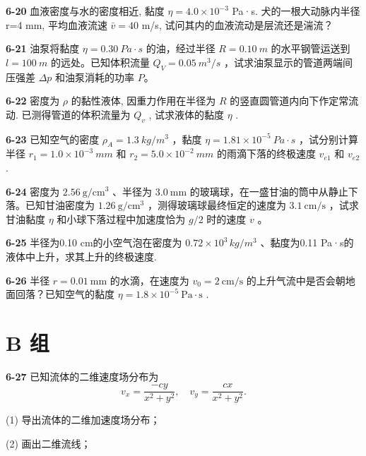 \newpage

\textbf{6-20} 血液密度与水的密度相近, 黏度 $\eta=4.0\times10^{-3}$ Pa·s. 犬的一根大动脉内半径 r=4 mm, 平均血液流速 $\bar{v}=40$ m/s, 试问其内的血液流动是层流还是湍流？

\newpage

\textbf{6-21} 油泵将黏度 $\eta=0.30\ Pa\cdot s$ 的油，经过半径 $R=0.10\ m$ 的水平钢管运送到 $l=100\ m$ 的远处。已知体积流量 $Q_{V}=0.05\ m^{3}/s$ ，试求油泵显示的管道两端间压强差 $\Delta p$ 和油泵消耗的功率 $P$。

\newpage

\textbf{6-22} 密度为 $\rho$ 的黏性液体, 因重力作用在半径为 $R$ 的竖直圆管道内向下作定常流动. 已测得管道的体积流量为 $Q_{v}$ , 试求液体的黏度 $\eta$ .

\newpage

\textbf{6-23} 已知空气的密度 $\rho_{A}=1.3\ kg/m^{3}$ ，黏度 $\eta=1.81\times10^{-5}\ Pa\cdot s$ ，试分别计算半径 $r_{1}=1.0\times10^{-3}\ mm$ 和 $r_{2}=5.0\times10^{-2}\ mm$ 的雨滴下落的终极速度 $v_{e1}$ 和 $v_{e2}$ .

\newpage

\textbf{6-24} 密度为 $2.56 \mathrm{~g} / \mathrm{cm}^{3}$ 、半径为 $3.0 \mathrm{~mm}$ 的玻璃球，在一盛甘油的筒中从静止下落。已知甘油密度为 $1.26 \mathrm{~g} / \mathrm{cm}^{3}$ ，测得玻璃球最终恒定的速度为 $3.1 \mathrm{~cm} / \mathrm{s}$ ，试求甘油黏度 $\eta$ 和小球下落过程中加速度恰为 $g / 2$ 时的速度 $v$ 。

\newpage

\textbf{6-25} 半径为0.10 cm的小空气泡在密度为 $0.72 \times 10^{3} \, kg/m^{3}$ 、黏度为0.11 Pa·s的液体中上升，求其上升的终极速度.

\newpage

\textbf{6-26} 半径 $r = 0.01 \mathrm{~mm}$ 的水滴，在速度为 $v_{0} = 2 \mathrm{~cm} / \mathrm{s}$ 的上升气流中是否会朝地面回落？已知空气的黏度 $\eta = 1.8 \times 10^{-5} \mathrm{~Pa} \cdot \mathrm{s}$ .


\newpage

\section*{B 组}
\vspace{0.3cm}
\textbf{6-27} 已知流体的二维速度场分布为
\[
v _ {x} = \frac {- c y}{x ^ {2} + y ^ {2}}, \quad v _ {y} = \frac {c x}{x ^ {2} + y ^ {2}}.
\]

(1) 导出流体的二维加速度场分布；

(2) 画出二维流线；

